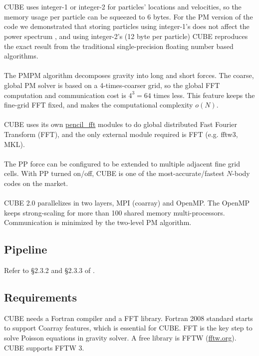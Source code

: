 \documentclass[12pt]{article}
\begin{document}
\\\\
CUBE uses integer-1 or integer-2 for particles' locations and velocities, so the memory usage per particle can be squeezed to 6 bytes. For the PM version of the code we demonstrated that storing particles using integer-1's does not affect the power spectrum \cite{2018ApJS..237...24Y}, and using integer-2's (12 byte per particle) CUBE reproduces the exact result from the traditional single-precision floating number based algorithms.
\\\\
The PMPM algorithm decomposes gravity into long and short forces. The coarse, global PM solver is based on a 4-times-coarser grid, so the global FFT computation and communication cost is $4^3=64$ times less. This feature keeps the fine-grid FFT fixed, and makes the computational complexity $o(N)$.
\\\\
CUBE uses its own \url{pencil_fft} modules to do global distributed Fast Fourier Transform (FFT), and the only external module required is FFT (e.g. fftw3, MKL).
\\\\
The PP force can be configured to be extended to multiple adjacent fine grid cells. With PP turned on/off, CUBE is one of the most-accurate/fastest $N$-body codes on the market.
\\\\
CUBE 2.0 parallelizes in two layers, MPI (coarray) and OpenMP. The OpenMP keeps strong-scaling for more than 100 shared memory multi-processors. Communication is minimized by the two-level PM algorithm.


\subsection{Pipeline}

Refer to \S 2.3.2 and \S 2.3.3 of \cite{2018ApJS..237...24Y}.

\subsection{Requirements}

CUBE needs a Fortran compiler and a FFT library. Fortran 2008 standard starts to support Coarray features, which is essential for CUBE. FFT is the key step to solve Poisson equations in gravity solver. A free library is FFTW (\url{fftw.org}). CUBE supports FFTW 3.
\end{document}
